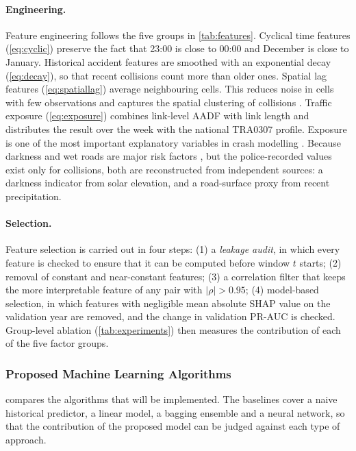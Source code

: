 \paragraph{Engineering.}
Feature engineering follows the five groups in \cref{tab:features}. Cyclical time features (\cref{eq:cyclic}) preserve the fact that 23:00 is close to 00:00 and December is close to January. Historical accident features are smoothed with an exponential decay (\cref{eq:decay}), so that recent collisions count more than older ones. Spatial lag features (\cref{eq:spatiallag}) average neighbouring cells. This reduces noise in cells with few observations and captures the spatial clustering of collisions \cite{anselin1988spatial}. Traffic exposure (\cref{eq:exposure}) combines link-level AADF with link length and distributes the result over the week with the national TRA0307 profile. Exposure is one of the most important explanatory variables in crash modelling \cite{lord2010statistical}. Because darkness and wet roads are major risk factors \cite{theofilatos2014review}, but the police-recorded values exist only for collisions, both are reconstructed from independent sources: a darkness indicator from solar elevation, and a road-surface proxy from recent precipitation.

\paragraph{Selection.}
Feature selection is carried out in four steps:
(1) a \emph{leakage audit}, in which every feature is checked to ensure that it can be computed before window $t$ starts;
(2) removal of constant and near-constant features;
(3) a correlation filter that keeps the more interpretable feature of any pair with $|\rho| > 0.95$;
(4) model-based selection, in which features with negligible mean absolute SHAP value on the validation year are removed, and the change in validation PR-AUC is checked.
Group-level ablation (\cref{tab:experiments}) then measures the contribution of each of the five factor groups.

\subsubsection{Proposed Machine Learning Algorithms}
\label{sec:algorithms}

 compares the algorithms that will be implemented. The baselines cover a naive historical predictor, a linear model, a bagging ensemble and a neural network, so that the contribution of the proposed model can be judged against each type of approach.

